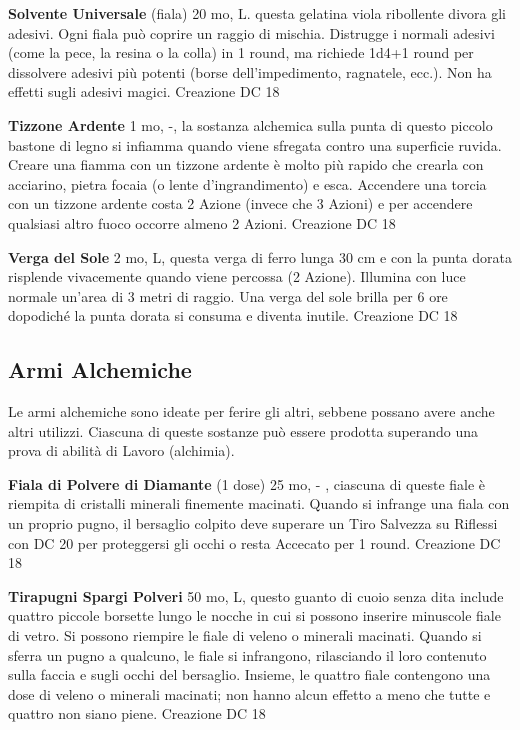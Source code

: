\documentclass[a4paper,11pt,twoside,openany]{book}
\begin{document}
\textbf{Solvente Universale} (fiala) 20 mo, L. questa gelatina viola ribollente divora gli adesivi. Ogni fiala può coprire un raggio di mischia. Distrugge i normali adesivi (come la pece, la resina o la colla) in 1 round, ma richiede 1d4+1 round per dissolvere adesivi più potenti (borse dell'impedimento, ragnatele, ecc.). Non ha effetti sugli adesivi magici. Creazione DC 18

\textbf{Tizzone Ardente} 1 mo, -, la sostanza alchemica sulla punta di questo piccolo bastone di legno si infiamma quando viene sfregata contro una superficie ruvida. Creare una fiamma con un tizzone ardente è molto più rapido che crearla con acciarino, pietra focaia (o lente d'ingrandimento) e esca. Accendere una torcia con un tizzone ardente costa 2 Azione (invece che 3 Azioni) e per accendere qualsiasi altro fuoco occorre almeno 2 Azioni. Creazione DC 18

\textbf{Verga del Sole} 2 mo, L, questa verga di ferro lunga 30 cm e con la punta dorata risplende vivacemente quando viene percossa (2 Azione). Illumina con luce normale un'area di 3 metri di raggio. Una verga del sole brilla per 6 ore dopodiché la punta dorata si consuma e diventa inutile. Creazione DC 18

\pagebreak

\subsection{Armi Alchemiche}

\label{armi-alchemiche}

Le armi alchemiche sono ideate per ferire gli altri, sebbene possano avere anche altri utilizzi. Ciascuna di queste sostanze può essere prodotta superando una prova di abilità di Lavoro (alchimia).

\textbf{Fiala di Polvere di Diamante} (1 dose) 25 mo, - , ciascuna di queste fiale è riempita di cristalli minerali finemente macinati. Quando si infrange una fiala con un proprio pugno, il bersaglio colpito deve superare un Tiro Salvezza su Riflessi con DC 20 per proteggersi gli occhi o resta Accecato per 1 round. Creazione DC 18

\textbf{Tirapugni Spargi Polveri} 50 mo, L, questo guanto di cuoio senza dita include quattro piccole borsette lungo le nocche in cui si possono inserire minuscole fiale di vetro. Si possono riempire le fiale di veleno o minerali macinati.
Quando si sferra un pugno a qualcuno, le fiale si infrangono, rilasciando il loro contenuto sulla faccia e sugli occhi del bersaglio. Insieme, le quattro fiale contengono una dose di veleno o minerali macinati; non hanno alcun effetto a meno che tutte e quattro non siano piene. Creazione DC 18
\end{document}
